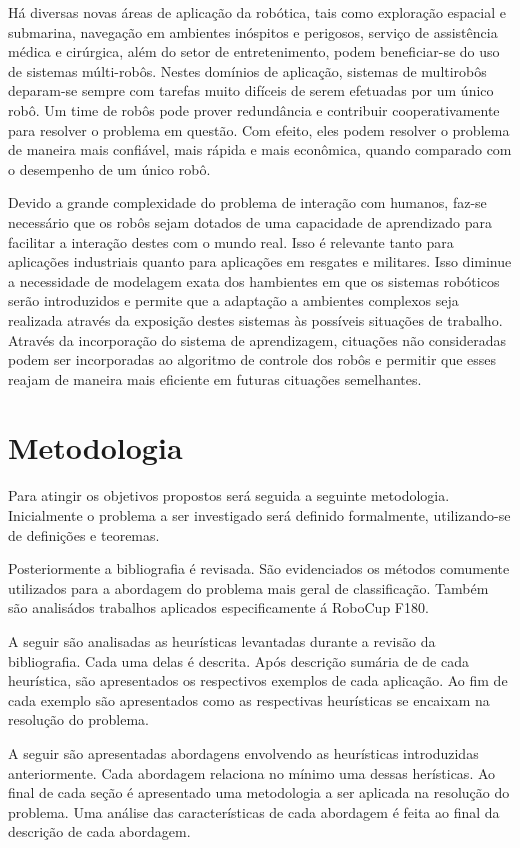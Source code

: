 Há diversas novas áreas de aplicação da robótica, tais como exploração espacial e submarina, 
navegação em ambientes inóspitos e perigosos, serviço de assistência médica
e cirúrgica, além do setor de entretenimento, podem beneficiar-se do uso de sistemas
múlti-robôs. Nestes domínios de aplicação, sistemas de multirobôs deparam-se sempre
com tarefas muito difíceis de serem efetuadas por um único robô. Um time de robôs pode
prover redundância e contribuir cooperativamente para resolver o problema em questão.
Com efeito, eles podem resolver o problema de maneira mais confiável, mais rápida e 
mais econômica, quando comparado com o desempenho de um único robô.

Devido a grande complexidade do problema de interação com humanos, faz-se necessário 
que os robôs sejam dotados de uma capacidade de aprendizado para facilitar a interação
destes com o mundo real. Isso é relevante tanto para aplicações industriais quanto para
aplicações em resgates e militares. Isso diminue a necessidade de modelagem
exata dos hambientes em que os sistemas robóticos serão introduzidos e permite que
a adaptação a ambientes complexos seja realizada através da exposição destes sistemas
às possíveis situações de trabalho. Através da incorporação do sistema de
aprendizagem, cituações não consideradas podem ser incorporadas ao algoritmo de
controle dos robôs e permitir que esses reajam de maneira mais eficiente em futuras
cituações semelhantes.

\section{Metodologia}

Para atingir os objetivos propostos será seguida a seguinte metodologia.
Inicialmente o problema a ser investigado será definido formalmente, 
utilizando-se de definições e teoremas.

Posteriormente a bibliografia é revisada. São evidenciados os métodos comumente
utilizados para a abordagem do problema mais geral de classificação. Também são
analisádos trabalhos aplicados especificamente á RoboCup F180.

A seguir são analisadas as heurísticas levantadas durante a
revisão da bibliografia. Cada uma delas é descrita. Após descrição sumária de
de cada heurística, são apresentados os respectivos exemplos de cada aplicação.
Ao fim de cada exemplo são apresentados como as respectivas heurísticas se encaixam na
resolução do problema. 

A seguir são apresentadas abordagens envolvendo as heurísticas introduzidas
anteriormente. Cada abordagem relaciona no mínimo uma dessas herísticas.
Ao final de cada seção é apresentado uma metodologia a ser aplicada
na resolução do problema. Uma análise das características de cada abordagem
é feita ao final da descrição de cada abordagem.

